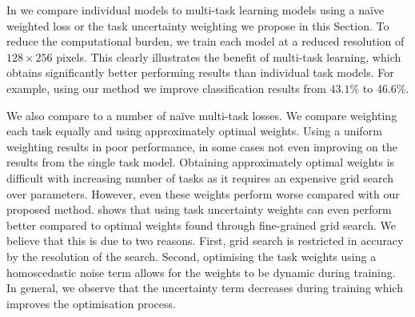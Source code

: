 In  we compare individual models to multi-task learning models using a na{\"i}ve weighted loss or the task uncertainty weighting we propose in this Section. To reduce the computational burden, we train each model at a reduced resolution of $128\times256$ pixels. This clearly illustrates the benefit of multi-task learning, which obtains significantly better performing results than individual task models. For example, using our method we improve classification results from $43.1\%$ to $46.6\%$.

We also compare to a number of na{\"i}ve multi-task losses. We compare weighting each task equally and using approximately optimal weights. Using a uniform weighting results in poor performance, in some cases not even improving on the results from the single task model. Obtaining approximately optimal weights is difficult with increasing number of tasks as it requires an expensive grid search over parameters. However, even these weights perform worse compared with our proposed method.  shows that using task uncertainty weights can even perform better compared to optimal weights found through fine-grained grid search. We believe that this is due to two reasons. First, grid search is restricted in accuracy by the resolution of the search. Second, optimising the task weights using a homoscedastic noise term allows for the weights to be dynamic during training. In general, we observe that the uncertainty term decreases during training which improves the optimisation process. 


